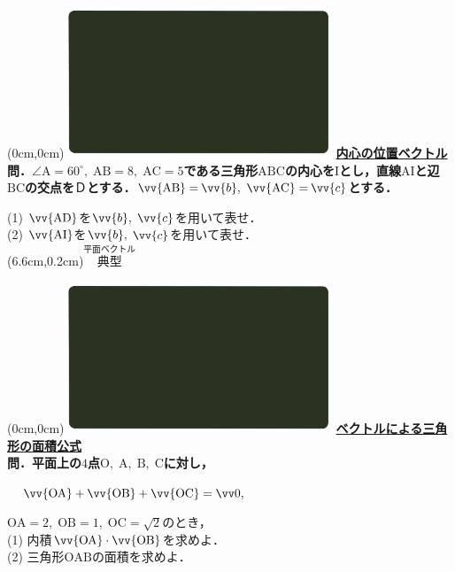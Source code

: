 \documentclass[10pt,
fleqn,
dvipdfmx,
uplatex
]{jsarticle}
\begin{document}
\at(0cm,0cm){\includegraphics[width=8cm,bb=0 0 1920 1080]{./media_local/smart_background/平面ベクトル.jpeg}}
{\color{orange}\bf\boldmath\LARGE\underline{内心の位置ベクトル}}\vspace{0.3zw}\\
\normalsize 
\bf\boldmath 問．$\angle \text{A}={60}^\circ ,\;\text{AB}=8,\;\text{AC}=5$である三角形$\text{ABC}$の内心を$\text{I}$とし，直線$\text{AI}$と辺$\text{BC}$の交点を$Ｄ$とする．$\vv{\text{AB}} =$$\vv{b},\;$$\vv{\text{AC}} =$$\vv{c}$とする．

\Large
(1) $\vv{\text{AD}}$を$\vv{b},\;$$\vv{c}$を用いて表せ．\\
(2) $\vv{\text{AI}}$を$\vv{b},\;$$\vv{c}$を用いて表せ．\\

\at(6.6cm,0.2cm){\small\color{bradorange}$\overset{\text{平面ベクトル}}{\text{典型}}$}


\newpage



\at(0cm,0cm){\includegraphics[width=8cm,bb=0 0 1920 1080]{./media_local/smart_background/平面ベクトル.jpeg}}
{\color{orange}\bf\boldmath\large\underline{ベクトルによる三角形の面積公式}}\vspace{0.3zw}\\
\large 
\bf\boldmath 問．平面上の$4$点$\text{O},\;\text{A},\;\text{B},\;\text{C}$に対し，
\vspace{0.3zw}

\ \ $\vv {\text{OA}}+\vv {\text{OB}}+\vv {\text{OC}}=\vv 0,$

\vspace{0.3zw}
$\text{OA}=2,\;\text{OB}=1,\;\text{OC}=\sqrt 2$のとき，\\
(1)  内積$\vv {\text{OA}}\cdot \vv {\text{OB}}$を求めよ．\\
(2)  三角形$\text{OAB}$の面積を求めよ．\\
\end{document}
